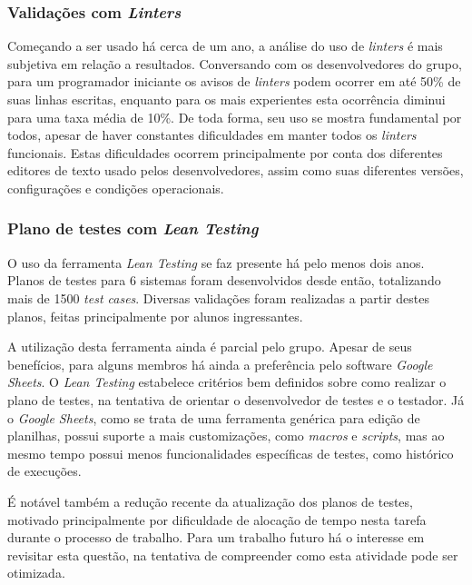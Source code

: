 \hypertarget{validacao-com-linters}{%
\subsubsection{\texorpdfstring{Validações com \emph{Linters}}{Validações com Linters}}\label{validacao-com-linters}}

Começando a ser usado há cerca de um ano, a análise do uso de \emph{linters} é mais subjetiva em relação a resultados. Conversando com os desenvolvedores do grupo, para um programador iniciante os avisos de \emph{linters} podem ocorrer em até 50\% de suas linhas escritas, enquanto para os mais experientes esta ocorrência diminui para uma taxa média de 10\%. De toda forma, seu uso se mostra fundamental por todos, apesar de haver constantes dificuldades em manter todos os \emph{linters} funcionais. Estas dificuldades ocorrem principalmente por conta dos diferentes editores de texto usado pelos desenvolvedores, assim como suas diferentes versões, configurações e condições operacionais.

\hypertarget{plano-de-testes-com-lean-testing}{%
\subsubsection{\texorpdfstring{Plano de testes com \emph{Lean Testing}}{Plano de testes com Lean Testing}}\label{plano-de-testes-com-lean-testing}}

O uso da ferramenta \emph{Lean Testing} se faz presente há pelo menos dois anos. Planos de testes para 6 sistemas foram desenvolvidos desde então, totalizando mais de 1500 \emph{test cases}. Diversas validações foram realizadas a partir destes planos, feitas principalmente por alunos ingressantes.

A utilização desta ferramenta ainda é parcial pelo grupo. Apesar de seus benefícios, para alguns membros há ainda a preferência pelo software \emph{Google Sheets}. O \emph{Lean Testing} estabelece critérios bem definidos sobre como realizar o plano de testes, na tentativa de orientar o desenvolvedor de testes e o testador. Já o \emph{Google Sheets}, como se trata de uma ferramenta genérica para edição de planilhas, possui suporte a mais customizações, como \emph{macros} e \emph{scripts}, mas ao mesmo tempo possui menos funcionalidades específicas de testes, como histórico de execuções.

É notável também a redução recente da atualização dos planos de testes, motivado principalmente por dificuldade de alocação de tempo nesta tarefa durante o processo de trabalho. Para um trabalho futuro há o interesse em revisitar esta questão, na tentativa de compreender como esta atividade pode ser otimizada.

